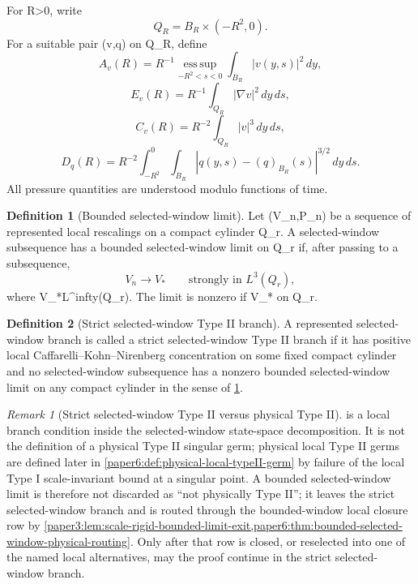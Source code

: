 \documentclass[11pt]{amsart}
\def\({}%
\def\){}%
\def\infty{infty}%
\theoremstyle{plain}
\theoremstyle{definition}
\newtheorem{definition}[definition]{Definition}
\theoremstyle{remark}
\newtheorem{remark}[remark]{Remark}
\begin{document}
For \(R>0\), write
\[
  Q_R=B_R\times(-R^2,0).
\]
For a suitable pair \((v,q)\) on \(Q_R\), define
\[
  A_v(R)=R^{-1}\operatorname*{ess\,sup}_{-R^2<s<0}
  \int_{B_R}|v(y,s)|^2\,dy,
\]
\[
  E_v(R)=R^{-1}\int_{Q_R}|\nabla v|^2\,dy\,ds,
\]
\[
  C_v(R)=R^{-2}\int_{Q_R}|v|^3\,dy\,ds,
\]
\[
  D_q(R)=R^{-2}\int_{-R^2}^0\int_{B_R}
  |q(y,s)-(q)_{B_R}(s)|^{3/2}\,dy\,ds.
\]
All pressure quantities are understood modulo functions of time.

\begin{definition}[Bounded selected-window limit]\label{paper1:def:bounded-window-limit}
Let \((V_n,P_n)\) be a sequence of represented local rescalings on a compact
cylinder \(Q_r\).  A selected-window subsequence has a bounded selected-window limit
on \(Q_r\) if, after passing to a subsequence,
\[
  V_n\to V_*
  \qquad\text{strongly in }L^3(Q_r),
\]
where \(V_*\in L^\infty(Q_r)\).  The limit is nonzero if
\(V_*\not{}\) on \(Q_r\).
\end{definition}

\begin{definition}[Strict selected-window Type II branch]\label{paper1:def:typeII}
A represented selected-window branch is called a strict selected-window Type II
branch if it has positive local Caffarelli--Kohn--Nirenberg concentration on
some fixed compact cylinder and no selected-window subsequence has a nonzero
bounded selected-window limit on any compact cylinder in the sense of
\cref{paper1:def:bounded-window-limit}.
\end{definition}

\begin{remark}[Strict selected-window Type II versus physical Type II]
\label{paper1:rem:strict-selected-window-vs-physical-typeII}
 is a local branch condition inside the
selected-window state-space decomposition.  It is not the definition of a
physical Type II singular germ; physical local Type II germs are defined later
in \cref{paper6:def:physical-local-typeII-germ} by failure of the local
Type I scale-invariant bound at a singular point.  A bounded selected-window
limit is therefore not discarded as ``not physically Type II''; it leaves the
strict selected-window branch and is routed through the bounded-window local
closure row by
\cref{paper3:lem:scale-rigid-bounded-limit-exit,paper6:thm:bounded-selected-window-physical-routing}.
Only after that row is closed, or reselected into one of the named local
alternatives, may the proof continue in the strict selected-window branch.
\end{remark}
\end{document}
